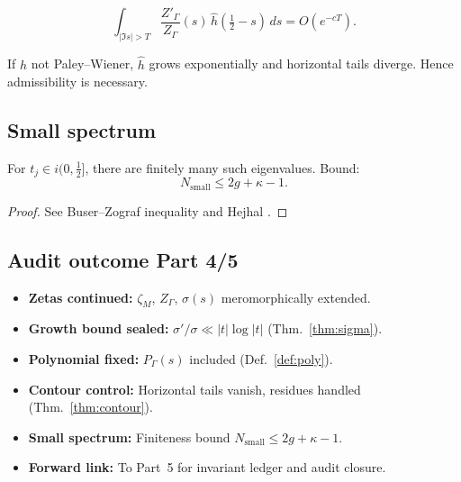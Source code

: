 \begin{lemma}
\[
\int_{|\Im s|>T} \frac{Z'_\Gamma}{Z_\Gamma}(s)\,\hat h(\tfrac12-s)\,ds = O(e^{-cT}).
\]
\end{lemma}

\begin{counterexample}
If $h$ not Paley–Wiener, $\widehat h$ grows exponentially and horizontal 
tails diverge. Hence admissibility is necessary.
\end{counterexample}

\subsection{Small spectrum}

\begin{proposition}
For $t_j \in i(0,\tfrac12]$, there are finitely many such eigenvalues.  
Bound:
\[
N_{\mathrm{small}} \le 2g + \kappa - 1.
\]
\end{proposition}

\begin{proof}
See Buser–Zograf inequality and Hejhal \cite{Hejhal1983}.
\end{proof}

\subsection{Audit outcome Part 4/5}

\begin{tcolorbox}[colback=gray!3,colframe=gray!65,title=Audit outcome — Part 4/5]
\begin{itemize}
\item \textbf{Zetas continued:} $\zeta_M$, $Z_\Gamma$, $\sigma(s)$ meromorphically extended.
\item \textbf{Growth bound sealed:} $\sigma'/\sigma \ll |t|\log|t|$ (Thm.~\ref{thm:sigma}).
\item \textbf{Polynomial fixed:} $P_\Gamma(s)$ included (Def.~\ref{def:poly}).
\item \textbf{Contour control:} Horizontal tails vanish, residues handled (Thm.~\ref{thm:contour}).
\item \textbf{Small spectrum:} Finiteness bound $N_{\mathrm{small}} \le 2g+\kappa-1$.
\item \textbf{Forward link:} To Part~5 for invariant ledger and audit closure.
\end{itemize}
\end{tcolorbox}

